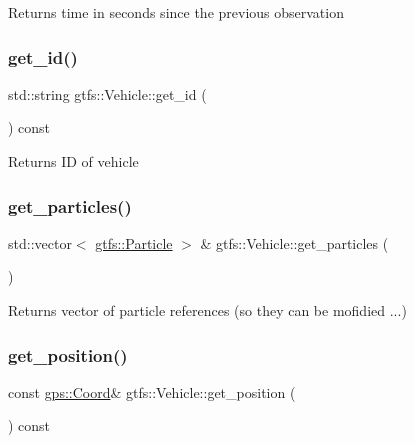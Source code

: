 \begin{DoxyReturn}{Returns}
time in seconds since the previous observation 
\end{DoxyReturn}
\mbox{\label{classgtfs_1_1Vehicle_a6b388986c9ed4af1eb86f13a3d2de8e0}} 
\subsubsection{\texorpdfstring{get\+\_\+id()}{get\_id()}}
{\footnotesize\ttfamily std\+::string gtfs\+::\+Vehicle\+::get\+\_\+id (\begin{DoxyParamCaption}{ }\end{DoxyParamCaption}) const}

\begin{DoxyReturn}{Returns}
ID of vehicle 
\end{DoxyReturn}
\mbox{\label{classgtfs_1_1Vehicle_a7b12b079c68880f00f532ca25858c368}} 
\subsubsection{\texorpdfstring{get\+\_\+particles()}{get\_particles()}}
{\footnotesize\ttfamily std\+::vector$<$ \hyperlink{classgtfs_1_1Particle}{gtfs\+::\+Particle} $>$ \& gtfs\+::\+Vehicle\+::get\+\_\+particles (\begin{DoxyParamCaption}{ }\end{DoxyParamCaption})}

\begin{DoxyReturn}{Returns}
vector of particle references (so they can be mofidied ...) 
\end{DoxyReturn}
\mbox{\label{classgtfs_1_1Vehicle_a108b44eeddcd90ebae8f6391f157c503}} 
\subsubsection{\texorpdfstring{get\+\_\+position()}{get\_position()}}
{\footnotesize\ttfamily const \hyperlink{classgps_1_1Coord}{gps\+::\+Coord}\& gtfs\+::\+Vehicle\+::get\+\_\+position (\begin{DoxyParamCaption}{ }\end{DoxyParamCaption}) const\hspace{0.3cm}{\ttfamily [inline]}}

